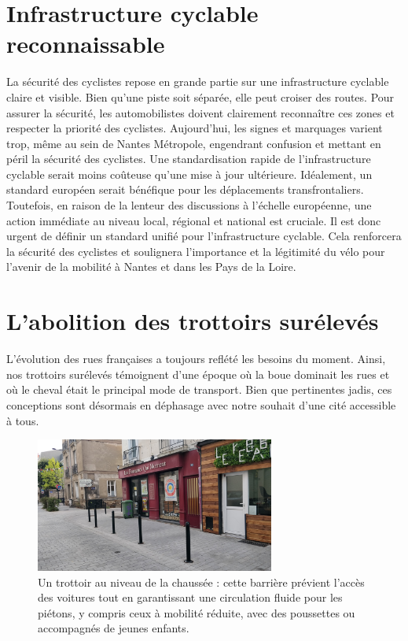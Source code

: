 


\section{Infrastructure cyclable reconnaissable}

La sécurité des cyclistes repose en grande partie sur une
infrastructure cyclable claire et visible. Bien qu'une piste soit
séparée, elle peut croiser des routes. Pour assurer la sécurité, les
automobilistes doivent clairement reconnaître ces zones et respecter
la priorité des cyclistes. Aujourd'hui, les signes et marquages
varient trop, même au sein de Nantes Métropole, engendrant confusion
et mettant en péril la sécurité des cyclistes. Une standardisation
rapide de l'infrastructure cyclable serait moins coûteuse qu'une mise
à jour ultérieure. Idéalement, un standard européen serait bénéfique
pour les déplacements transfrontaliers. Toutefois, en raison de la
lenteur des discussions à l'échelle européenne, une action immédiate
au niveau local, régional et national est cruciale. Il est donc urgent
de définir un standard unifié pour l'infrastructure cyclable. Cela
renforcera la sécurité des cyclistes et soulignera l'importance et la
légitimité du vélo pour l'avenir de la mobilité à Nantes et dans les
Pays de la Loire.


\section{L’abolition des trottoirs surélevés}

L'évolution des rues françaises a toujours reflété les besoins du
moment. Ainsi, nos trottoirs surélevés témoignent d’une époque où la
boue dominait les rues et où le cheval était le principal mode de
transport. Bien que pertinentes jadis, ces conceptions sont désormais
en déphasage avec notre souhait d'une cité accessible à tous.

\begin{figure}[hb]
  \centering
  \includegraphics[width=0.7\textwidth]{images/IMG_20230914_075143-ped.jpg}
  \caption{Un trottoir au niveau de la chaussée : cette barrière
    prévient l'accès des voitures tout en garantissant une circulation
    fluide pour les piétons, y compris ceux à mobilité réduite, avec
    des poussettes ou accompagnés de jeunes enfants.}
  \label{fig:ped-flat}
\end{figure}

